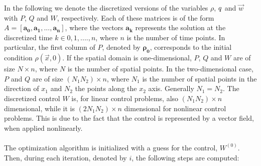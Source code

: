 In the following we denote the discretized versions of the variables $\rho$, $q$ and $\vec{w}$ with $P$, $Q$ and $W$, respectively. Each of these matrices is of the form $A = [\boldsymbol{a_0}, \boldsymbol{a_1}, ... ,\boldsymbol{a_n}]$, where the vectors $\boldsymbol{a_k}$ represents the solution at the discretized time $k \in 0,1,....,n$, where $n$ is the number of time points. In particular, the first column of $P$, denoted by $\boldsymbol{\rho_0}$, corresponds to the initial condition $\rho(\vec{x},0)$. If the spatial domain is one-dimensional, $P$, $Q$ and $W$ are of size $N \times n$, where $N$ is the number of spatial points. In the two-dimensional case, $P$ and $Q$ are of size $(N_1N_2) \times n$, where $N_1$ is the number of spatial points in the direction of $x_1$ and $N_2$ the points along the $x_2$ axis. Generally $N_1 = N_2$. The discretized control $W$ is, for linear control problems, also $(N_1N_2) \times n$ dimensional, while it is $(2N_1N_2) \times n$ dimensional for nonlinear control problems. This is due to the fact that the control is represented by a vector field, when applied nonlinearly.
\\
\\
The optimization algorithm is initialized with a guess for the control, $W^{(0)}$. Then, during each iteration, denoted by $i$, the following steps are computed:
\vspace{0.1cm}
